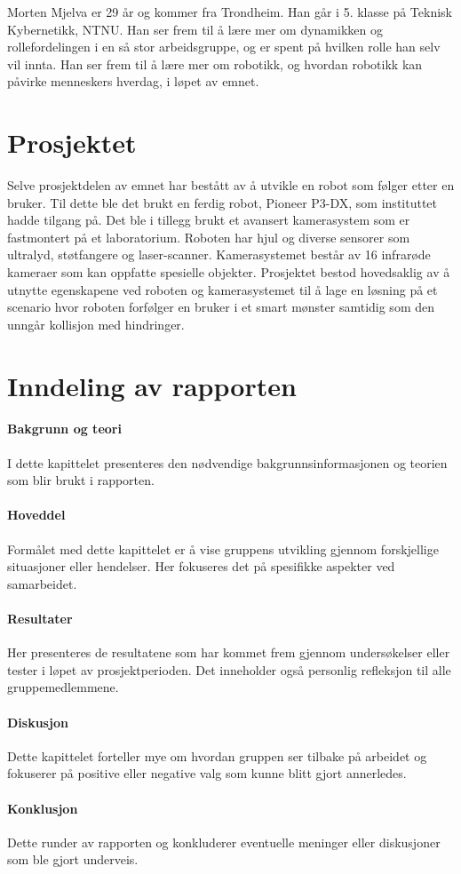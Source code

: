 Morten Mjelva er 29 år og kommer fra Trondheim. Han går i 5. klasse på Teknisk Kybernetikk, NTNU. Han ser frem til å lære mer om dynamikken og rollefordelingen i en så stor arbeidsgruppe, og er spent på hvilken rolle han selv vil innta. Han ser frem til å lære mer om robotikk, og hvordan robotikk kan påvirke menneskers hverdag, i løpet av emnet.

\section{Prosjektet}

Selve prosjektdelen av emnet har bestått av å utvikle en robot som følger etter en bruker. Til dette ble det brukt en ferdig robot, Pioneer P3-DX, som instituttet hadde tilgang på. Det ble i tillegg brukt et avansert kamerasystem som er fastmontert på et laboratorium. Roboten har hjul og diverse sensorer som ultralyd, støtfangere og laser-scanner. Kamerasystemet består av 16 infrarøde kameraer som kan oppfatte spesielle objekter. Prosjektet bestod hovedsaklig av å utnytte egenskapene ved roboten og kamerasystemet til å lage en løsning på et scenario hvor roboten forfølger en bruker i et smart mønster samtidig som den unngår kollisjon med hindringer. 

\section{Inndeling av rapporten}
\paragraph{Bakgrunn og teori}
I dette kapittelet presenteres den nødven\-dige bakgrunnsinformasjonen og teorien som blir brukt i rapporten. 

\paragraph{Hoveddel}
Formålet med dette kapittelet er å vise gruppens utvikling gjennom forskjellige situasjoner eller hendelser. Her fokuseres det på spesifikke aspekter ved samarbeidet. 

\paragraph{Resultater}
Her presenteres de resultatene som har kommet frem gjennom undersøkelser eller tester i løpet av prosjektperioden. Det inneholder også personlig refleksjon til alle gruppemedlemmene. 

\paragraph{Diskusjon}
Dette kapittelet forteller mye om hvordan gruppen ser tilbake på arbeidet og fokuserer på positive eller negative valg som kunne blitt gjort annerledes. 

\paragraph{Konklusjon}
Dette runder av rapporten og konkluderer eventuelle meninger eller diskusjoner som ble gjort underveis. 